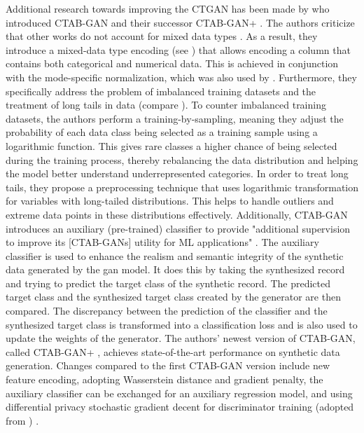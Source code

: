 Additional research towards improving the CTGAN has been made by \textcite{zhao2021CTABGANEffectiveTablea} who introduced CTAB-GAN and their successor CTAB-GAN+ \cite{zhao2022CTABGANEnhancingTabular}.
The authors criticize that other works do not account for mixed data types \cite{zhao2022CTABGANEnhancingTabular}.
As a result, they introduce a mixed-data type encoding (see ) that allows encoding a column that contains both categorical and numerical data.
This is achieved in conjunction with the mode-specific normalization, which was also used by \textcite{xu2018SynthesizingTabularData, xu2019ModelingTabularData}.
Furthermore, they specifically address the problem of imbalanced training datasets and the treatment of long tails in data (compare ).
To counter imbalanced training datasets, the authors perform a training-by-sampling, meaning they adjust the probability of each data class being selected as a training sample using a logarithmic function.
This gives rare classes a higher chance of being selected during the training process, thereby rebalancing the data distribution and helping the \gls{model} better understand underrepresented categories.
In order to treat long tails, they propose a preprocessing technique that uses logarithmic transformation for variables with long-tailed distributions. 
This helps to handle outliers and extreme data points in these distributions effectively.
Additionally, CTAB-GAN introduces an auxiliary (pre-trained) classifier to provide "additional supervision to improve its [CTAB-GANs] utility for ML applications" \cite[p. 2]{zhao2021CTABGANEffectiveTablea}.
The auxiliary classifier is used to enhance the realism and semantic integrity of the synthetic data generated by the \gls{gan} \gls{model}. 
It does this by taking the synthesized record and trying to predict the target class of the synthetic record.
The predicted target class and the synthesized target class created by the generator are then compared.
The discrepancy between the prediction of the classifier and the synthesized target class is transformed into a classification loss and is also used to update the weights of the generator.
The authors' newest version of CTAB-GAN, called CTAB-GAN+ \cite{zhao2022CTABGANEnhancingTabular}, achieves state-of-the-art performance on synthetic data generation.
Changes compared to the first CTAB-GAN version include new feature encoding, adopting Wasserstein distance and gradient penalty, the auxiliary classifier can be exchanged for an auxiliary regression \gls{model},
and using differential privacy stochastic gradient decent \cite{abadi2016DeepLearningDifferential} for discriminator training (adopted from \cite{jordon2018PATEGANGeneratingSynthetic}) \cite{zhao2022CTABGANEnhancingTabular}.

